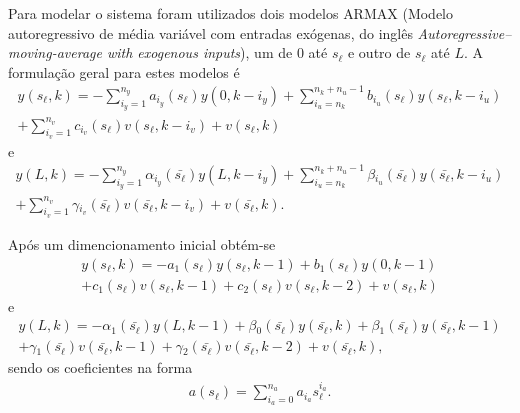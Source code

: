 Para modelar o sistema foram utilizados dois modelos \ac{ARMAX} (Modelo
autoregressivo de média variável com entradas exógenas, do inglês
\textit{Autoregressive–moving-average with exogenous inputs}), um de \( 0 \) até
\( s_\ell \) e outro de \( s_\ell \) até \( L \). A formulação geral para estes
modelos é
%
\begin{equation}
	\label{eq:lpv-polynom-generic-sl}
	\begin{split}
		y(s_\ell,k) = -\sum_{i_y=1}^{n_y}a_{i_y}(s_\ell)y(0,k-i_y)
		+\sum_{i_u=n_k}^{n_k+n_u-1}b_{i_u}(s_\ell)y(s_\ell,k-i_u) \\
		+\sum_{i_v=1}^{n_v}c_{i_v}(s_\ell)v(s_\ell,k-i_v)+v(s_\ell,k)
	\end{split}
\end{equation}
%
e
%
\begin{equation}
	\label{eq:lpv-polynom-generic-L}
	\begin{split}
		y(L,k) = -\sum_{i_y=1}^{n_y}\alpha{}_{i_y}(\bar{s_\ell})y(L,k-i_y)
		+\sum_{i_u=n_k}^{n_k+n_u-1}\beta{}_{i_u}(\bar{s_\ell})y(\bar{s_\ell},k-i_u) \\
		+\sum_{i_v=1}^{n_v}\gamma{}_{i_v}(\bar{s_\ell})v(\bar{s_\ell},k-i_v)+v(\bar{s_\ell},k).
	\end{split}
\end{equation}

Após um dimencionamento inicial obtém-se
%
\begin{equation}
	\label{eq:lpv-polynom-sl}
	\begin{split}
		y(s_\ell,k) = -a_1(s_\ell)y(s_\ell,k-1) + b_1(s_\ell)y(0,k-1) \\
		+ c_1(s_\ell)v(s_\ell,k-1) + c_2(s_\ell)v(s_\ell,k-2)
		+ v(s_\ell,k)
	\end{split}
\end{equation}
%
e
%
\begin{equation}
	\label{eq:lpv-polynom-L}
	\begin{split}
		y(L,k) = -\alpha{}_1(\bar{s_\ell})y(L,k-1)
		+ \beta{}_0(\bar{s_\ell})y(\bar{s_\ell},k)
		+ \beta{}_1(\bar{s_\ell})y(\bar{s_\ell},k-1) \\
		+ \gamma{}_1(\bar{s_\ell})v(\bar{s_\ell},k-1)
		+ \gamma{}_2(\bar{s_\ell})v(\bar{s_\ell},k-2)
		+ v(\bar{s_\ell},k),
	\end{split}
\end{equation}
%
sendo os coeficientes na forma
%
\begin{equation}
	\label{eq:lpv-coeffs-form}
	\begin{split}
		a(s_\ell)=\sum_{i_a=0}^{n_a}a_{i_a}s_{\ell}^{i_a}.
	\end{split}
\end{equation}

